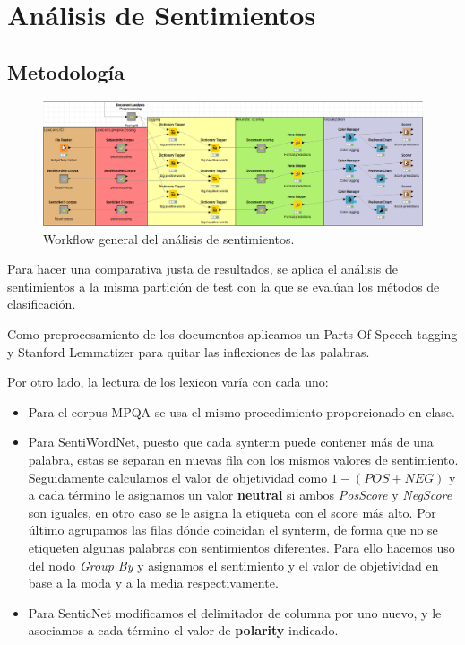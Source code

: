 \section{Análisis de Sentimientos}

\subsection{Metodología}

\begin{figure}[H]
    \center\includegraphics[width=.95\linewidth]{img/analysis/workflow.png}
    \caption{Workflow general del análisis de sentimientos.}
\end{figure}

Para hacer una comparativa justa de resultados, se aplica el análisis de sentimientos a la misma partición de test con la que se evalúan los métodos de clasificación.

Como preprocesamiento de los documentos aplicamos un Parts Of Speech tagging y Stanford Lemmatizer para quitar las inflexiones de las palabras.

\vspace{\baselineskip}

Por otro lado, la lectura de los lexicon varía con cada uno:
\begin{itemize}
    \item Para el corpus MPQA se usa el mismo procedimiento proporcionado en clase.
    \item Para SentiWordNet, puesto que cada synterm puede contener más de una palabra, estas se separan en nuevas fila con los mismos valores de sentimiento.
    \vspace{\baselineskip}
    Seguidamente calculamos el valor de objetividad como $1 - (POS + NEG)$ y a cada término le asignamos un valor \textbf{neutral} si ambos \textit{PosScore} y \textit{NegScore} son iguales, en otro caso se le asigna la etiqueta con el score más alto.
    \vspace{\baselineskip}
    Por último agrupamos las filas dónde coincidan el synterm, de forma que no se etiqueten algunas palabras con sentimientos diferentes. Para ello hacemos uso del nodo \textit{Group By} y asignamos el sentimiento y el valor de objetividad en base a la moda y a la media respectivamente.
    \item Para SenticNet modificamos el delimitador de columna por uno nuevo, y le asociamos a cada término el valor de \textbf{polarity} indicado.
\end{itemize}

